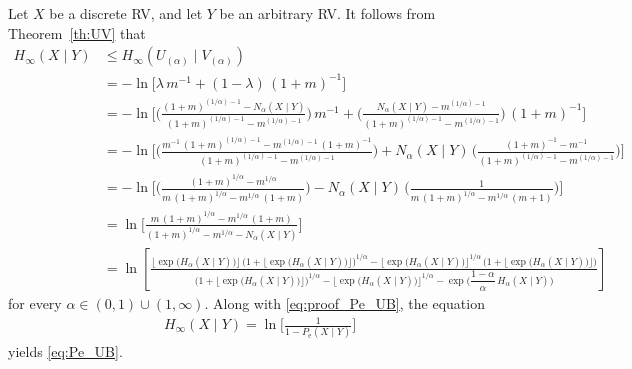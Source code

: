 \documentclass[conference, draftcls, onecolumn]{IEEEtran}
\theoremstyle{plain}
\newcommand{\thref}[1]{Theorem~\ref{#1}}
\newcommand{\corref}[1]{Corollary~\ref{#1}}
\begin{document}
\begin{IEEEproof}[Proof of \corref{cor:bound_Pe}]
Let $X$ be a discrete RV, and let $Y$ be an arbitrary RV.
It follows from \thref{th:UV} that
\begin{align}
H_{\infty}(X \mid Y)
& \le
H_{\infty}(U_{(\alpha)} \mid V_{(\alpha)})
\\
& =
- \ln \! \Big[ \lambda \, m^{-1} + (1-\lambda) \, (1+m)^{-1} \Big]
\\
& =
- \ln \! \bigg[ \bigg( \frac{ (1+m)^{(1/\alpha)-1} - N_{\alpha}(X \mid Y) }{ (1+m)^{(1/\alpha)-1} - m^{(1/\alpha)-1} } \bigg) \, m^{-1} + \bigg( \frac{ N_{\alpha}(X \mid Y) - m^{(1/\alpha)-1} }{ (1+m)^{(1/\alpha)-1} - m^{(1/\alpha)-1} } \bigg) \, (1+m)^{-1} \bigg]
\\
& =
- \ln \! \bigg[ \bigg( \frac{ m^{-1} \, (1+m)^{(1/\alpha)-1} - m^{(1/\alpha)-1} \, (1+m)^{-1} }{ (1+m)^{(1/\alpha)-1} - m^{(1/\alpha)-1} } \bigg) + N_{\alpha}(X \mid Y) \, \bigg( \frac{ (1+m)^{-1} - m^{-1} }{ (1+m)^{(1/\alpha)-1} - m^{(1/\alpha)-1} } \bigg) \bigg]
\\
& =
- \ln \! \bigg[ \bigg( \frac{ (1+m)^{1/\alpha} - m^{1/\alpha} }{ m \, (1+m)^{1/\alpha} - m^{1/\alpha} \, (1+m) } \bigg) - N_{\alpha}(X \mid Y) \, \bigg( \frac{ 1 }{ m \, (1+m)^{1/\alpha} - m^{1/\alpha} \, (m+1) } \bigg)\bigg]
\\
& =
\ln \! \bigg[ \frac{ m \, (1+m)^{1/\alpha} - m^{1/\alpha} \, (1+m) }{ (1+m)^{1/\alpha} - m^{1/\alpha} - N_{\alpha}(X \mid Y) } \bigg]
\\
& =
\ln \! \left[ \frac{ \Big\lfloor \exp \big( H_{\alpha}(X \mid Y) \big) \Big\rfloor \, \Big(1 + \Big\lfloor \exp \big( H_{\alpha}(X \mid Y) \big) \Big\rfloor\Big)^{1/\alpha} - \Big\lfloor \exp \big( H_{\alpha}(X \mid Y) \big) \Big\rfloor^{1/\alpha} \, \Big(1 + \Big\lfloor \exp \big( H_{\alpha}(X \mid Y) \big) \Big\rfloor\Big) }{ \Big(1 + \Big\lfloor \exp \big( H_{\alpha}(X \mid Y) \big) \Big\rfloor \Big)^{1/\alpha} - \Big\lfloor \exp \big( H_{\alpha}(X \mid Y) \big) \Big\rfloor^{1/\alpha} - \exp \Big( \dfrac{ 1 - \alpha }{ \alpha } \, H_{\alpha}(X \mid Y) \Big) } \right]
\label{eq:proof_Pe_UB}
\end{align}
for every $\alpha \in (0, 1) \cup (1, \infty)$.
Along with \eqref{eq:proof_Pe_UB}, the equation
\begin{align}
H_{\infty}(X \mid Y)
=
\ln \bigg[ \frac{ 1 }{ 1 - P_{\mathrm{e}}(X \mid Y) } \bigg]
\label{eq:minH_Pe}
\end{align}
yields \eqref{eq:Pe_UB}.


\end{IEEEproof}
\end{document}
